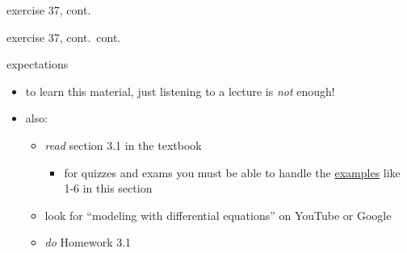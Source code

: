 \documentclass[colorlinks]{beamer}
\begin{document}
\begin{frame}{exercise 37, cont.}


\end{frame}


\begin{frame}{exercise 37, cont.~cont.}

\vspace{20mm}

\hfill %
\end{frame}


\begin{frame}{expectations}

\begin{itemize}
\item to learn this material, just listening to a lecture is \emph{not} enough!

\item also:
     \begin{itemize}
     \item \emph{read} section 3.1 in the textbook
         \begin{itemize}
         \item for quizzes and exams you must be able to handle the \underline{examples} like 1-6 in this section
         \end{itemize}
     \item look for ``modeling with differential equations'' on YouTube or Google
     \item \emph{do} Homework 3.1
     \end{itemize}
\end{itemize}
\end{frame}
\end{document}
